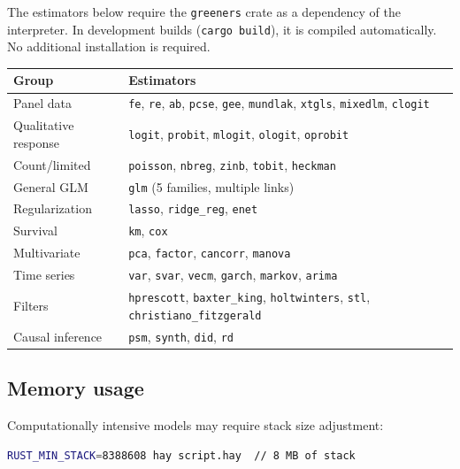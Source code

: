 The estimators below require the \texttt{greeners} crate as a dependency
of the interpreter. In development builds (\texttt{cargo build}), it is
compiled automatically. No additional installation is required.

\begin{center}
\begin{tabular}{ll}
\toprule
\textbf{Group} & \textbf{Estimators} \\
\midrule
Panel data         & \texttt{fe}, \texttt{re}, \texttt{ab}, \texttt{pcse}, \texttt{gee},
                     \texttt{mundlak}, \texttt{xtgls}, \texttt{mixedlm}, \texttt{clogit} \\
Qualitative response & \texttt{logit}, \texttt{probit}, \texttt{mlogit},
                       \texttt{ologit}, \texttt{oprobit} \\
Count/limited      & \texttt{poisson}, \texttt{nbreg}, \texttt{zinb},
                     \texttt{tobit}, \texttt{heckman} \\
General GLM        & \texttt{glm} (5 families, multiple links) \\
Regularization     & \texttt{lasso}, \texttt{ridge\_reg}, \texttt{enet} \\
Survival           & \texttt{km}, \texttt{cox} \\
Multivariate       & \texttt{pca}, \texttt{factor}, \texttt{cancorr}, \texttt{manova} \\
Time series        & \texttt{var}, \texttt{svar}, \texttt{vecm}, \texttt{garch},
                     \texttt{markov}, \texttt{arima} \\
Filters            & \texttt{hprescott}, \texttt{baxter\_king}, \texttt{holtwinters},
                     \texttt{stl}, \texttt{christiano\_fitzgerald} \\
Causal inference   & \texttt{psm}, \texttt{synth}, \texttt{did}, \texttt{rd} \\
\bottomrule
\end{tabular}
\end{center}

\subsection*{Memory usage}

Computationally intensive models may require stack size adjustment:

\begin{lstlisting}[style=inline, language=sh]
RUST_MIN_STACK=8388608 hay script.hay  // 8 MB of stack
\end{lstlisting}

